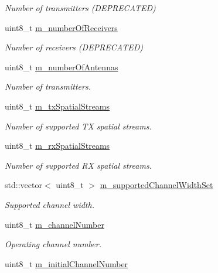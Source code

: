 \begin{DoxyCompactItemize}
\begin{DoxyCompactList}\small\item\em Number of transmitters (D\+E\+P\+R\+E\+C\+A\+T\+ED) \end{DoxyCompactList}\item 
uint8\+\_\+t \hyperlink{classns3_1_1WifiPhy_a2fca337488695e8f4e35813505184b4b}{m\+\_\+number\+Of\+Receivers}
\begin{DoxyCompactList}\small\item\em Number of receivers (D\+E\+P\+R\+E\+C\+A\+T\+ED) \end{DoxyCompactList}\item 
uint8\+\_\+t \hyperlink{classns3_1_1WifiPhy_a5bd02c25f62d98dad463610d29c9b9c1}{m\+\_\+number\+Of\+Antennas}
\begin{DoxyCompactList}\small\item\em Number of transmitters. \end{DoxyCompactList}\item 
uint8\+\_\+t \hyperlink{classns3_1_1WifiPhy_a0eb352acc5252d87026c154c673060f5}{m\+\_\+tx\+Spatial\+Streams}
\begin{DoxyCompactList}\small\item\em Number of supported TX spatial streams. \end{DoxyCompactList}\item 
uint8\+\_\+t \hyperlink{classns3_1_1WifiPhy_ab9fec8645bb349ca71409ba5c00d7165}{m\+\_\+rx\+Spatial\+Streams}
\begin{DoxyCompactList}\small\item\em Number of supported RX spatial streams. \end{DoxyCompactList}\item 
std\+::vector$<$ uint8\+\_\+t $>$ \hyperlink{classns3_1_1WifiPhy_ad3e92b538b136420723c2743261bb987}{m\+\_\+supported\+Channel\+Width\+Set}
\begin{DoxyCompactList}\small\item\em Supported channel width. \end{DoxyCompactList}\item 
uint8\+\_\+t \hyperlink{classns3_1_1WifiPhy_adb98cbe4c4c82208862a25b6ad908765}{m\+\_\+channel\+Number}
\begin{DoxyCompactList}\small\item\em Operating channel number. \end{DoxyCompactList}\item 
uint8\+\_\+t \hyperlink{classns3_1_1WifiPhy_a318e964855d1e96bfb3af870be9fc0a2}{m\+\_\+initial\+Channel\+Number}

\end{DoxyCompactItemize}
